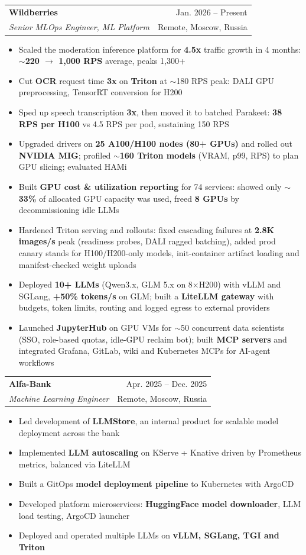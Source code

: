 \documentclass[letterpaper,11pt]{article}
\makeatletter
\newcommand{\resumeItem}[1]{
  \item\small{
    {#1 \vspace{-1pt}}
  }
}
\newcommand{\resumeSubheading}[4]{
  \vspace{-1pt}\item
    \begin{tabular*}{\textwidth}[t]{l@{\extracolsep{\fill}}r}
      \textbf{#1} & {\color{dark-grey}\small #2}\vspace{1pt}\\ %
      \textit{#3} & {\color{dark-grey} \small #4}\\ %
    \end{tabular*}\vspace{-4pt}
}
\newcommand{\resumeItemListStart}{\begin{itemize}}
\newcommand{\resumeItemListEnd}{\end{itemize}\vspace{0pt}}
\makeatother
\begin{document}
    \resumeSubheading
      {Wildberries}{Jan. 2026 -- Present}
      {Senior MLOps Engineer, ML Platform}{Remote, Moscow, Russia}
      \resumeItemListStart
        \resumeItem{Scaled the moderation inference platform for \textbf{4.5x} traffic growth in 4 months: $\sim$\textbf{220 $\to$ 1,000 RPS} average, peaks 1,300+}
        \resumeItem{Cut \textbf{OCR} request time \textbf{3x} on \textbf{Triton} at $\sim$180 RPS peak: DALI GPU preprocessing, TensorRT conversion for H200}
        \resumeItem{Sped up speech transcription \textbf{3x}, then moved it to batched Parakeet: \textbf{38 RPS per H100} vs 4.5 RPS per pod, sustaining 150 RPS}
        \resumeItem{Upgraded drivers on \textbf{25 A100/H100 nodes (80+ GPUs)} and rolled out \textbf{NVIDIA MIG}; profiled $\sim$\textbf{160 Triton models} (VRAM, p99, RPS) to plan GPU slicing; evaluated HAMi}
        \resumeItem{Built \textbf{GPU cost \& utilization reporting} for 74 services: showed only $\sim$\textbf{33\%} of allocated GPU capacity was used, freed \textbf{8 GPUs} by decommissioning idle LLMs}
        \resumeItem{Hardened Triton serving and rollouts: fixed cascading failures at \textbf{2.8K images/s} peak (readiness probes, DALI ragged batching), added prod canary stands for H100/H200-only models, init-container artifact loading and manifest-checked weight uploads}
        \resumeItem{Deployed \textbf{10+ LLMs} (Qwen3.x, GLM 5.x on 8$\times$H200) with vLLM and SGLang, \textbf{+50\% tokens/s} on GLM; built a \textbf{LiteLLM gateway} with budgets, token limits, routing and logged egress to external providers}
        \resumeItem{Launched \textbf{JupyterHub} on GPU VMs for $\sim$50 concurrent data scientists (SSO, role-based quotas, idle-GPU reclaim bot); built \textbf{MCP servers} and integrated Grafana, GitLab, wiki and Kubernetes MCPs for AI-agent workflows}
      \resumeItemListEnd

    \resumeSubheading
      {Alfa-Bank}{Apr. 2025 -- Dec. 2025}
      {Machine Learning Engineer}{Remote, Moscow, Russia}
      \resumeItemListStart
        \resumeItem{Led development of \textbf{LLMStore}, an internal product for scalable model deployment across the bank}
        \resumeItem{Implemented \textbf{LLM autoscaling} on KServe + Knative driven by Prometheus metrics, balanced via LiteLLM}
        \resumeItem{Built a GitOps \textbf{model deployment pipeline} to Kubernetes with ArgoCD}
        \resumeItem{Developed platform microservices: \textbf{HuggingFace model downloader}, LLM load testing, ArgoCD launcher}
        \resumeItem{Deployed and operated multiple LLMs on \textbf{vLLM, SGLang, TGI and Triton}}
      \resumeItemListEnd
\end{document}
